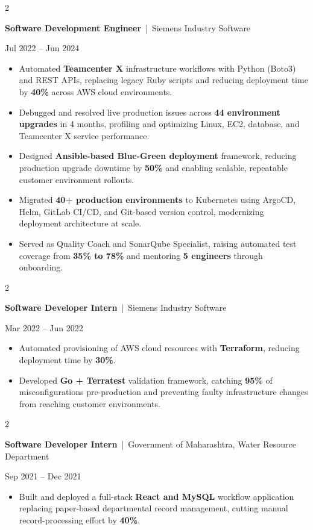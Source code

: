 \documentclass[10pt, letterpaper]{article}
\newenvironment{highlights}{
    \begin{itemize}[
        topsep=0.10 cm,
        parsep=0.06 cm,
        partopsep=0pt,
        itemsep=0.06 cm,
        leftmargin=12pt
    ]
}{
    \end{itemize}
}
\newenvironment{twocolentry}[2][]{
    \onecolentry
    \def\secondColumn{#2}
    \setcolumnwidth{\fill, 4.5 cm}
    \begin{paracol}{2}
}{
    \switchcolumn \raggedleft \secondColumn
    \end{paracol}
    \endonecolentry
}
\begin{document}
\vspace{0.15 cm}

\begin{twocolentry}{Jul 2022 -- Jun 2024}
\textbf{Software Development Engineer} \,|\, Siemens Industry Software
\end{twocolentry}
\begin{highlights}
  \item Automated \textbf{Teamcenter X} infrastructure workflows with Python (Boto3) and REST APIs, replacing legacy Ruby scripts and reducing deployment time by \textbf{40\%} across AWS cloud environments.
  \item Debugged and resolved live production issues across \textbf{44 environment upgrades} in 4 months, profiling and optimizing Linux, EC2, database, and Teamcenter X service performance.
  \item Designed \textbf{Ansible-based Blue-Green deployment} framework, reducing production upgrade downtime by \textbf{50\%} and enabling scalable, repeatable customer environment rollouts.
  \item Migrated \textbf{40+ production environments} to Kubernetes using ArgoCD, Helm, GitLab CI/CD, and Git-based version control, modernizing deployment architecture at scale.
  \item Served as Quality Coach and SonarQube Specialist, raising automated test coverage from \textbf{35\% to 78\%} and mentoring \textbf{5 engineers} through onboarding.
\end{highlights}

\vspace{0.15 cm}

\begin{twocolentry}{Mar 2022 -- Jun 2022}
\textbf{Software Developer Intern} \,|\, Siemens Industry Software
\end{twocolentry}
\begin{highlights}
  \item Automated provisioning of AWS cloud resources with \textbf{Terraform}, reducing deployment time by \textbf{30\%}.
  \item Developed \textbf{Go + Terratest} validation framework, catching \textbf{95\%} of misconfigurations pre-production and preventing faulty infrastructure changes from reaching customer environments.
\end{highlights}

\vspace{0.15 cm}

\begin{twocolentry}{Sep 2021 -- Dec 2021}
\textbf{Software Developer Intern} \,|\, Government of Maharashtra, Water Resource Department
\end{twocolentry}
\begin{highlights}
  \item Built and deployed a full-stack \textbf{React and MySQL} workflow application replacing paper-based departmental record management, cutting manual record-processing effort by \textbf{40\%}.
\end{highlights}
\end{document}
